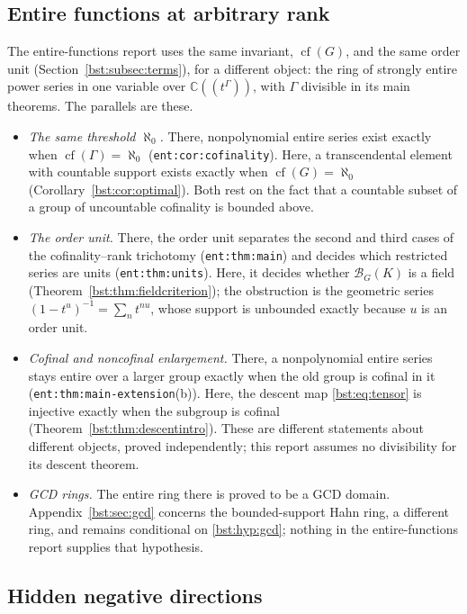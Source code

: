 \documentclass[11pt,letterpaper]{article}
\theoremstyle{definition}
\theoremstyle{remark}
\newcommand{\C}{\mathbb C}
\newcommand{\cof}{\operatorname{cf}}
\newcommand{\BB}[2]{\mathcal B_{#2}(#1)}
\begin{document}
\subsection{Entire functions at arbitrary rank}\label{bst:subsec:entire}

The entire-functions report \cite{RepoEntire} uses the same invariant,
$\cof(G)$, and the same order unit (Section~\ref{bst:subsec:terms}), for a
different object: the ring of strongly entire power series in one variable
over $\C((t^\Gamma))$, with $\Gamma$ divisible in its main theorems. The
parallels are these.
\begin{itemize}
\item \emph{The same threshold $\aleph_0$.} There, nonpolynomial entire
series exist exactly when $\cof(\Gamma)=\aleph_0$ (\texttt{ent:cor:cofinality}).
Here, a transcendental element with countable support exists exactly when
$\cof(G)=\aleph_0$ (Corollary~\ref{bst:cor:optimal}). Both rest on the fact
that a countable subset of a group of uncountable cofinality is bounded above.
\item \emph{The order unit.} There, the order unit separates the second and
third cases of the cofinality--rank trichotomy (\texttt{ent:thm:main}) and
decides which restricted series are units (\texttt{ent:thm:units}). Here, it
decides whether $\BB KG$ is a field (Theorem~\ref{bst:thm:fieldcriterion});
the obstruction is the geometric series $(1-t^u)^{-1}=\sum_nt^{nu}$, whose
support is unbounded exactly because $u$ is an order unit.
\item \emph{Cofinal and noncofinal enlargement.} There, a nonpolynomial
entire series stays entire over a larger group exactly when the old group is
cofinal in it (\texttt{ent:thm:main-extension}(b)). Here, the descent map
\eqref{bst:eq:tensor} is injective exactly when the subgroup is cofinal
(Theorem~\ref{bst:thm:descentintro}). These are different statements about
different objects, proved independently; this report assumes no
divisibility for its descent theorem.
\item \emph{GCD rings.} The entire ring there is proved to be a GCD domain.
Appendix~\ref{bst:sec:gcd} concerns the bounded-support Hahn ring, a different
ring, and remains conditional on \eqref{bst:hyp:gcd}; nothing in the
entire-functions report supplies that hypothesis.
\end{itemize}

\subsection{Hidden negative directions}\label{bst:subsec:hidden}
\end{document}
